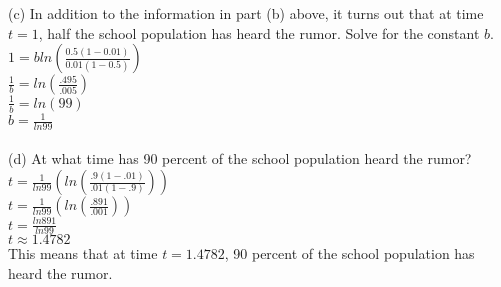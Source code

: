 \documentclass[11pt, oneside]{article}   	%
\begin{document}
(c) In addition to the information in part (b) above, it turns out that at time $t=1$, half the school population has heard the rumor. Solve for the constant $b$. \\
$1 = bln(\frac{0.5(1-0.01)}{0.01(1-0.5)})$\\
$\frac{1}{b} = ln(\frac{.495}{.005})$\\
$\frac{1}{b} = ln(99)$\\
$b = \frac{1}{ln99}$\\~\\
(d) At what time has 90 percent of the school population heard the rumor?\\
$t = \frac{1}{ln99}(ln(\frac{.9(1-.01)}{.01(1-.9)}))$\\
$t = \frac{1}{ln99}(ln(\frac{.891}{.001}))$\\
$t = \frac{ln891}{ln99}$\\
$t \approx 1.4782$\\
This means that at time $t=1.4782$, 90 percent of the school population has heard the rumor.\\
\end{document}
